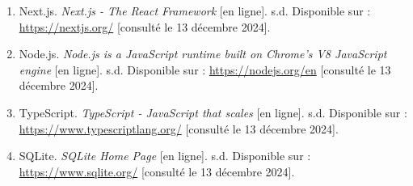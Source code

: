\begin{enumerate}
    \item \label{source:16} Next.js. \emph{Next.js - The React Framework} [en ligne]. s.d. Disponible sur : \url{https://nextjs.org/} [consulté le 13 décembre 2024].

    \item \label{source:17} Node.js. \emph{Node.js is a JavaScript runtime built on Chrome's V8 JavaScript engine} [en ligne]. s.d. Disponible sur : \url{https://nodejs.org/en} [consulté le 13 décembre 2024].

    \item \label{source:18} TypeScript. \emph{TypeScript - JavaScript that scales} [en ligne]. s.d. Disponible sur : \url{https://www.typescriptlang.org/} [consulté le 13 décembre 2024].

    \item \label{source:19} SQLite. \emph{SQLite Home Page} [en ligne]. s.d. Disponible sur : \url{https://www.sqlite.org/} [consulté le 13 décembre 2024].
\end{enumerate}

